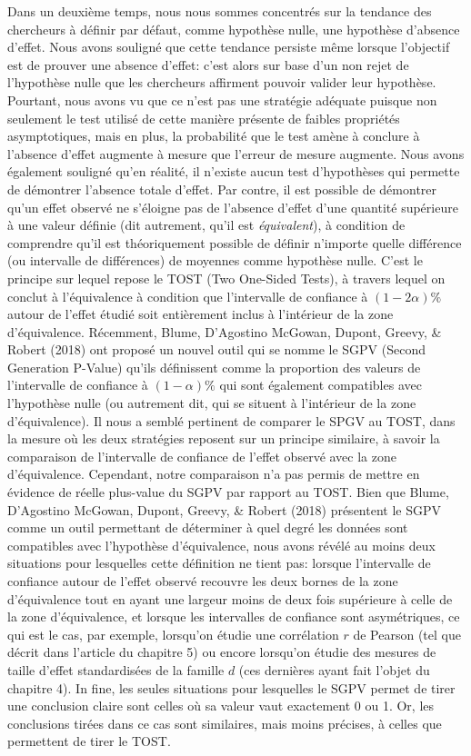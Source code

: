 \documentclass[
  12pt,
  french,
]{article}
\begin{document}
Dans un deuxième temps, nous nous sommes concentrés sur la tendance des
chercheurs à définir par défaut, comme hypothèse nulle, une hypothèse
d'absence d'effet. Nous avons souligné que cette tendance persiste même
lorsque l'objectif est de prouver une absence d'effet: c'est alors sur
base d'un non rejet de l'hypothèse nulle que les chercheurs affirment
pouvoir valider leur hypothèse. Pourtant, nous avons vu que ce n'est pas
une stratégie adéquate puisque non seulement le test utilisé de cette
manière présente de faibles propriétés asymptotiques, mais en plus, la
probabilité que le test amène à conclure à l'absence d'effet augmente à
mesure que l'erreur de mesure augmente. Nous avons également souligné
qu'en réalité, il n'existe aucun test d'hypothèses qui permette de
démontrer l'absence totale d'effet. Par contre, il est possible de
démontrer qu'un effet observé ne s'éloigne pas de l'absence d'effet
d'une quantité supérieure à une valeur définie (dit autrement, qu'il est
\emph{équivalent}), à condition de comprendre qu'il est théoriquement
possible de définir n'importe quelle différence (ou intervalle de
différences) de moyennes comme hypothèse nulle. C'est le principe sur
lequel repose le TOST (Two One-Sided Tests), à travers lequel on conclut
à l'équivalence à condition que l'intervalle de confiance à
\((1-2\alpha)\%\) autour de l'effet étudié soit entièrement inclus à
l'intérieur de la zone d'équivalence. Récemment, Blume, D'Agostino
McGowan, Dupont, Greevy, \& Robert (2018) ont proposé un nouvel outil
qui se nomme le SGPV (Second Generation P-Value) qu'ils définissent
comme la proportion des valeurs de l'intervalle de confiance à
\((1-\alpha)\%\) qui sont également compatibles avec l'hypothèse nulle
(ou autrement dit, qui se situent à l'intérieur de la zone
d'équivalence). Il nous a semblé pertinent de comparer le SPGV au TOST,
dans la mesure où les deux stratégies reposent sur un principe
similaire, à savoir la comparaison de l'intervalle de confiance de
l'effet observé avec la zone d'équivalence. Cependant, notre comparaison
n'a pas permis de mettre en évidence de réelle plus-value du SGPV par
rapport au TOST. Bien que Blume, D'Agostino McGowan, Dupont, Greevy, \&
Robert (2018) présentent le SGPV comme un outil permettant de déterminer
à quel degré les données sont compatibles avec l'hypothèse
d'équivalence, nous avons révélé au moins deux situations pour
lesquelles cette définition ne tient pas: lorsque l'intervalle de
confiance autour de l'effet observé recouvre les deux bornes de la zone
d'équivalence tout en ayant une largeur moins de deux fois supérieure à
celle de la zone d'équivalence, et lorsque les intervalles de confiance
sont asymétriques, ce qui est le cas, par exemple, lorsqu'on étudie une
corrélation \(r\) de Pearson (tel que décrit dans l'article du chapitre
5) ou encore lorsqu'on étudie des mesures de taille d'effet
standardisées de la famille \(d\) (ces dernières ayant fait l'objet du
chapitre 4). In fine, les seules situations pour lesquelles le SGPV
permet de tirer une conclusion claire sont celles où sa valeur vaut
exactement 0 ou 1. Or, les conclusions tirées dans ce cas sont
similaires, mais moins précises, à celles que permettent de tirer le
TOST.
\end{document}
